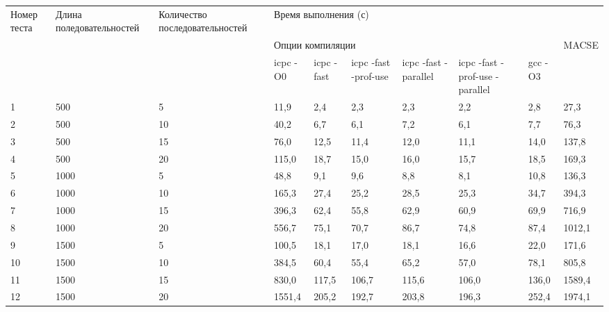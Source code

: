 \begin{landscape}
\begin{table}[htbp]
\caption{Результаты тестирования}
\begin{flushright}
\begin{longtable}{|p{1cm}|*{2}{p{3cm}|}*{2}{p{1.8cm}|}*{3}{p{2.8cm}|}*{2}{p{1.8cm}|}}
\hline
\multicolumn{ 1}{|p{1cm}|}{Номер теста} & \multicolumn{ 1}{p{3cm}|}{Длина поледовательностей} & \multicolumn{ 1}{p{3cm}|}{Количество последовательностей} & \multicolumn{ 7}{p{15.6cm}|}{Время выполнения (с)} \\ \cline{ 4- 10}
\multicolumn{ 1}{|p{1cm}|}{} & \multicolumn{ 1}{p{3cm}|}{} & \multicolumn{ 1}{p{3cm}|}{} & \multicolumn{ 6}{p{10.8cm}|}{Опции компиляции } & \multicolumn{ 1}{p{1.8cm}|}{MACSE} \\ \cline{ 4- 9}
\multicolumn{ 1}{|p{1cm}|}{} & \multicolumn{ 1}{|p{3cm}|}{} & \multicolumn{ 1}{p{3cm}|}{} & \multicolumn{1}{p{1.8cm}|}{icpc -O0} & \multicolumn{ 1}{p{1.8cm}|}{icpc -fast} & \multicolumn{1}{p{1.8cm}|}{icpc  -fast -prof-use} & \multicolumn{1}{p{1.8cm}|}{icpc -fast -parallel} & \multicolumn{ 1}{p{1.8cm}|}{icpc -fast -prof-use -parallel} & \multicolumn{1}{p{1.8cm}|}{gcc -O3} & \multicolumn{ 1}{p{1.8cm}|}{} \\ 
\hline
1 & 500 & 5 & 11,9 & 2,4 & 2,3 & 2,3 & 2,2 & 2,8 & 27,3 \\ \hline
2 & 500 & 10 & 40,2 & 6,7 & 6,1 & 7,2 & 6,1 & 7,7 & 76,3 \\ \hline
3 & 500 & 15 & 76,0 & 12,5 & 11,4 & 12,0 & 11,1 & 14,0 & 137,8 \\ \hline
4 & 500 & 20 & 115,0 & 18,7 & 15,0 & 16,0 & 15,7 & 18,5 & 169,3 \\ \hline
5 & 1000 & 5 & 48,8 & 9,1 & 9,6 & 8,8 & 8,1 & 10,8 & 136,3 \\ \hline
6 & 1000 & 10 & 165,3 & 27,4 & 25,2 & 28,5 & 25,3 & 34,7 & 394,3 \\ \hline
7 & 1000 & 15 & 396,3 & 62,4 & 55,8 & 62,9 & 60,9 & 69,9 & 716,9 \\ \hline
8 & 1000 & 20 & 556,7 & 75,1 & 70,7 & 86,7 & 74,8 & 87,4 & 1012,1 \\ \hline
9 & 1500 & 5 & 100,5 & 18,1 & 17,0 & 18,1 & 16,6 & 22,0 & 171,6 \\ \hline
10 & 1500 & 10 & 384,5 & 60,4 & 55,4 & 65,2 & 57,0 & 78,1 & 805,8 \\ \hline
11 & 1500 & 15 & 830,0 & 117,5 & 106,7 & 115,6 & 106,0 & 136,0 & 1589,4 \\ \hline
12 & 1500 & 20 & 1551,4 & 205,2 & 192,7 & 203,8 & 196,3 & 252,4 & 1974,1 \\ \hline

\end{longtable}
\end{flushright}
\end{table}
\end{landscape}
